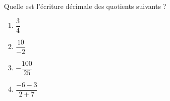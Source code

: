 
\begin{exercice}\label{exosmath-0749}

    Quelle est l'écriture décimale des quotients suivants ?
    \begin{multicols}{2}
        \begin{enumerate}
            \item
                \( \dfrac{ 3 }{ 4 }\)
            \item
                $\dfrac{10}{-2}$
            \item
                \( -\dfrac{ 100 }{ 25 }\)
            \item
                \( \dfrac{ -6-3 }{ 2+7 }\)
        \end{enumerate}
    \end{multicols}

\end{exercice}
